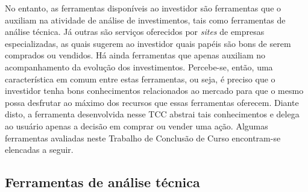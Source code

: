 No entanto, as ferramentas disponíveis ao investidor são ferramentas que o auxiliam na atividade de análise de investimentos, tais como ferramentas de análise técnica. Já outras são serviços oferecidos por \textit{sites} de empresas especializadas, as quais sugerem ao investidor quais papéis são bons de serem comprados ou vendidos. Há ainda ferramentas que apenas auxiliam no acompanhamento da evolução dos investimentos. Percebe-se, então, uma característica em comum entre estas ferramentas, ou seja, é preciso que o investidor tenha bons conhecimentos relacionados ao mercado para que o mesmo possa desfrutar ao máximo dos recursos que essas ferramentas oferecem. Diante disto, a ferramenta desenvolvida nesse TCC abstrai tais conhecimentos e delega ao usuário apenas a decisão em comprar ou vender uma ação. Algumas ferramentas avaliadas neste Trabalho de Conclusão de Curso encontram-se elencadas a seguir.

\subsection{Ferramentas de análise técnica}

